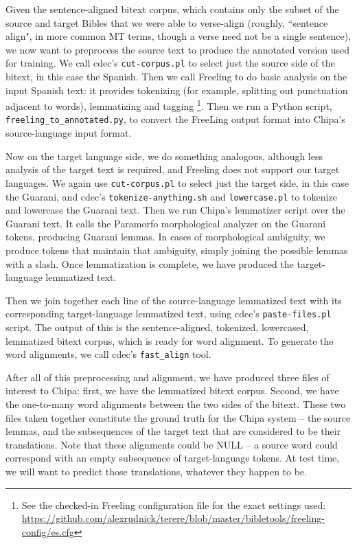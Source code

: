 Given the sentence-aligned bitext corpus, which contains only the subset of the
source and target Bibles that we were able to verse-align (roughly, ``sentence
align", in more common MT terms, though a verse need not be a single sentence),
we now want to preprocess the source text to produce the annotated version used
for training. We call cdec's \texttt{cut-corpus.pl} to select just the source
side of the bitext, in this case the Spanish. Then we call Freeling to do basic
analysis on the input Spanish text: it provides tokenizing (for example,
splitting out punctuation adjacent to words), lemmatizing and tagging
\footnote{See the checked-in Freeling configuration file for the exact settings
used:
\url{https://github.com/alexrudnick/terere/blob/master/bibletools/freeling-config/es.cfg}}.
Then we run a Python script, \texttt{freeling\_to\_annotated.py}, to convert
the FreeLing output format into Chipa's source-language input format.

Now on the target language side, we do something analogous, although less
analysis of the target text is required, and Freeling does not support our
target languages. We again use \texttt{cut-corpus.pl} to select just the target
side, in this case the Guarani, and cdec's \texttt{tokenize-anything.sh} and
\texttt{lowercase.pl} to tokenize and lowercase the Guarani text. Then we run
Chipa's lemmatizer script over the Guarani text. It calls the Paramorfo
morphological analyzer on the Guarani tokens, producing Guarani lemmas. In
cases of morphological ambiguity, we produce tokens that maintain that
ambiguity, simply joining the possible lemmas with a slash.  Once lemmatization
is complete, we have produced the target-language lemmatized text.

Then we join together each line of the source-language lemmatized text with its
corresponding target-language lemmatized text, using cdec's
\texttt{paste-files.pl} script. The output of this is the sentence-aligned,
tokenized, lowercased, lemmatized bitext corpus, which is ready for word
alignment. To generate the word alignments, we call cdec's \texttt{fast\_align}
tool.

After all of this preprocessing and alignment, we have produced three files of
interest to Chipa: first, we have the lemmatized bitext corpus. Second, we have
the one-to-many word alignments between the two sides of the bitext. These two
files taken together constitute the ground truth for the Chipa system -- the
source lemmas, and the subsequences of the target text that are considered to
be their translations. Note that these alignments could be NULL -- a source
word could correspond with an empty subsequence of target-language tokens. At
test time, we will want to predict those translations, whatever they happen to
be.

